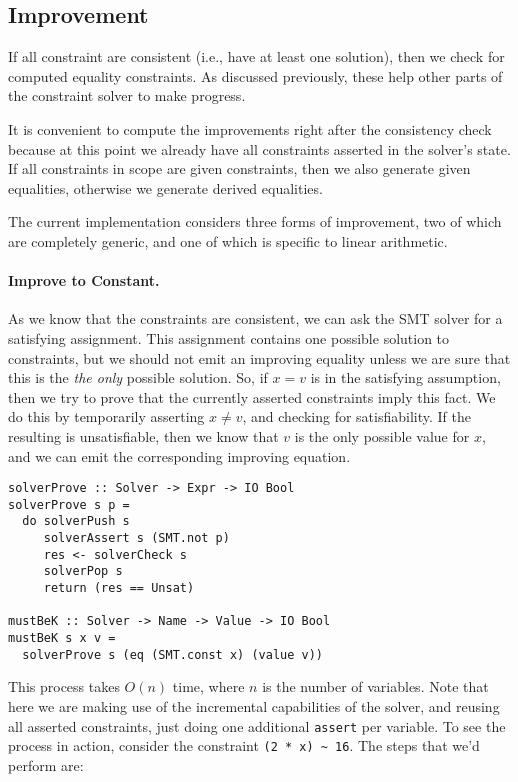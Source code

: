 \documentclass{sigplanconf}
\begin{document}
\subsection{Improvement}

If all constraint are consistent (i.e., have at least one solution),
then we check for computed equality constraints.  As discussed previously,
these help other parts of the constraint solver to make progress.

It is convenient to compute the improvements right after the consistency
check because at this point we already have all constraints asserted
in the solver's state.  If all constraints in scope are given constraints,
then we also generate given equalities, otherwise we generate derived
equalities.

The current implementation considers three forms of improvement,
two of which are completely generic, and one of which is specific to
linear arithmetic.

\paragraph{Improve to Constant.} As we know that the constraints are
consistent, we can ask the SMT solver for a satisfying assignment.
This assignment contains one possible solution to constraints, but
we should not emit an improving equality unless we are sure that
this is the {\em the only} possible solution.  So, if $x = v$ is
in the satisfying assumption, then we try to prove that the currently
asserted constraints imply this fact.  We do this by temporarily asserting
$x \neq v$, and checking for satisfiability.  If the resulting is unsatisfiable,
then we know that $v$ is the only possible value for $x$,
and we can emit the corresponding improving equation.
\begin{Verbatim}
solverProve :: Solver -> Expr -> IO Bool
solverProve s p =
  do solverPush s
     solverAssert s (SMT.not p)
     res <- solverCheck s
     solverPop s
     return (res == Unsat)

mustBeK :: Solver -> Name -> Value -> IO Bool
mustBeK s x v =
  solverProve s (eq (SMT.const x) (value v))
\end{Verbatim}
This process takes $O(n)$ time, where $n$ is the number of variables.
Note that here we are making use of the incremental capabilities of the
solver, and reusing all asserted constraints, just doing one
additional \Verb"assert" per variable. To see the process in action,
consider the constraint \Verb"(2 * x) ~ 16".  The steps that we'd perform
are:
\end{document}

